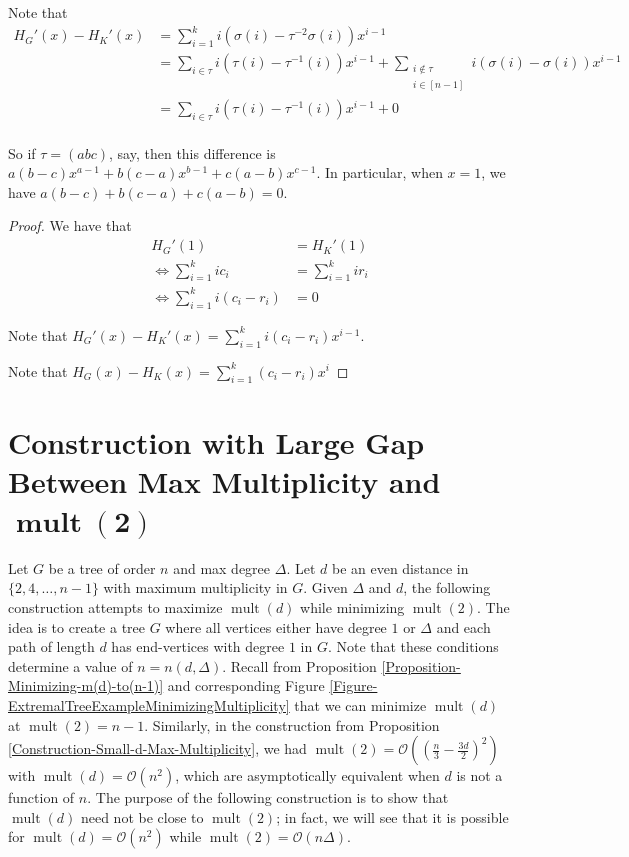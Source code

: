 \documentclass[12]{article}
\DeclareMathOperator{\mult}{mult}
\theoremstyle{definition}
\begin{document}
	Note that 
	\begin{align*}
		H_G'(x) - H_K'(x) &= \sum_{i=1}^{k}i(\sigma(i)-\tau^{-2}\sigma(i))x^{i-1}	\\
		&= \sum_{i \in \tau} i(\tau(i)-\tau^{-1}(i))x^{i-1} + \sum_{\substack{i \notin \tau \\ i \in [n-1]}} i(\sigma(i)-\sigma(i))x^{i-1}	\\
		&= \sum_{i \in \tau} i(\tau(i)-\tau^{-1}(i))x^{i-1} + 0	\\
	\end{align*}
	
	So if $\tau = (abc)$, say, then this difference is $a(b-c)x^{a-1} + b(c-a)x^{b-1} + c(a-b)x^{c-1}$.  In particular, when $x=1$, we have $a(b-c) + b(c-a) + c(a-b) = 0$.

	\begin{proof}
		We have that
		\begin{align*}
			H_G'(1) &= H_K'(1)	\\
			\Leftrightarrow \sum_{i=1}^{k} ic_i &= \sum_{i=1}^{k} ir_i	\\
			\Leftrightarrow \sum_{i=1}^{k} i(c_i-r_i) &= 0
		\end{align*}
	
		Note that $H_G'(x) - H_K'(x) = \sum_{i=1}^{k}i(c_i-r_i)x^{i-1}$.
		
		Note that $H_G(x) - H_K(x) = \sum_{i=1}^{k}(c_i-r_i)x^{i}$
	\end{proof}
	\fi
	
	\section{Construction with Large Gap Between Max Multiplicity and $\mathbf{\mult(2)}$}
	
	Let $G$ be a tree of order $n$ and max degree $\Delta$.  Let $d$ be an even distance in $\{2,4,\ldots, n-1\}$ with maximum multiplicity in $G$.  Given $\Delta$ and $d$, the following construction attempts to maximize $\mult(d)$ while minimizing $\mult(2)$.  The idea is to create a tree $G$ where all vertices either have degree $1$ or $\Delta$ and each path of length $d$ has end-vertices with degree $1$ in $G$.  Note that these conditions determine a value of $n = n(d,\Delta)$.  Recall from Proposition \ref{Proposition-Minimizing-m(d)-to(n-1)} and corresponding Figure \ref{Figure-ExtremalTreeExampleMinimizingMultiplicity} that we can minimize $\mult(d)$ at $\mult(2) = n-1$.  Similarly, in the construction from Proposition \ref{Construction-Small-d-Max-Multiplicity}, we had $\mult(2) = \mathcal{O}((\tfrac{n}{3}-\tfrac{3d}{2})^2)$ with $\mult(d) = \mathcal{O}(n^2)$, which are asymptotically equivalent when $d$ is not a function of $n$.  The purpose of the following construction is to show that $\mult(d)$ need not be close to $\mult(2)$; in fact, we will see that it is possible for $\mult(d) = \mathcal{O}(n^2)$ while $\mult(2) = \mathcal{O}(n\Delta)$.
	
\end{document}
